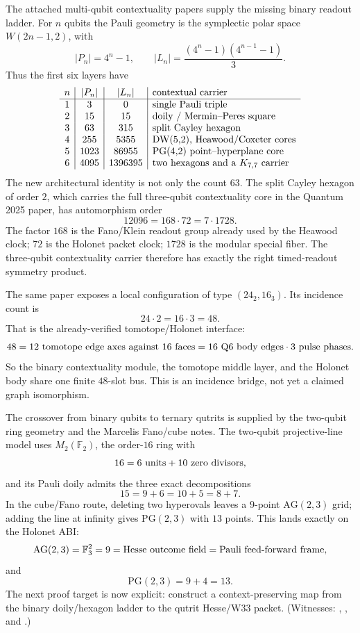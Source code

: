 \documentclass[11pt]{article}
\begin{document}
The attached multi-qubit contextuality papers supply the missing binary
readout ladder.  For \(n\) qubits the Pauli geometry is the symplectic polar
space \(W(2n-1,2)\), with
\[
  |P_n|=4^n-1,\qquad
  |L_n|=\frac{(4^n-1)(4^{n-1}-1)}{3}.
\]
Thus the first six layers have
\[
\begin{array}{c|c|c|l}
n & |P_n| & |L_n| & \hbox{contextual carrier}\\
\hline
1 & 3 & 0 & \hbox{single Pauli triple}\\
2 & 15 & 15 & \hbox{doily / Mermin--Peres square}\\
3 & 63 & 315 & \hbox{split Cayley hexagon}\\
4 & 255 & 5355 & \hbox{DW(5,2), Heawood/Coxeter cores}\\
5 & 1023 & 86955 & \hbox{PG(4,2) point--hyperplane core}\\
6 & 4095 & 1396395 & \hbox{two hexagons and a }K_{7,7}\hbox{ carrier}
\end{array}
\]
The new architectural identity is not only the count \(63\).  The split
Cayley hexagon of order \(2\), which carries the full three-qubit
contextuality core in the Quantum 2025 paper, has automorphism order
\[
  12096 = 168\cdot 72 = 7\cdot 1728.
\]
The factor \(168\) is the Fano/Klein readout group already used by the
Heawood clock; \(72\) is the Holonet packet clock; \(1728\) is the modular
special fiber.  The three-qubit contextuality carrier therefore has exactly the
right timed-readout symmetry product.

The same paper exposes a local configuration of type \((24_2,16_3)\).  Its
incidence count is
\[
  24\cdot2 = 16\cdot3 = 48.
\]
That is the already-verified tomotope/Holonet interface:
\[
  48 = 12\hbox{ tomotope edge axes against }16\hbox{ faces}
     = 16\hbox{ Q6 body edges}\cdot3\hbox{ pulse phases}.
\]
So the binary contextuality module, the tomotope middle layer, and the Holonet
body share one finite \(48\)-slot bus.  This is an incidence bridge, not yet a
claimed graph isomorphism.

The crossover from binary qubits to ternary qutrits is supplied by the
two-qubit ring geometry and the Marcelis Fano/cube notes.  The two-qubit
projective-line model uses \(M_2(\mathbb F_2)\), the order-\(16\) ring with
\[
  16 = 6\hbox{ units} + 10\hbox{ zero divisors},
\]
and its Pauli doily admits the three exact decompositions
\[
  15=9+6=10+5=8+7.
\]
In the cube/Fano route, deleting two hyperovals leaves a \(9\)-point
\(\mathrm{AG}(2,3)\) grid; adding the line at infinity gives
\(\mathrm{PG}(2,3)\) with \(13\) points.  This lands exactly on the Holonet
ABI:
\[
  \mathrm{AG}(2,3)=\mathbb F_3^2=9
    = \hbox{Hesse outcome field}
    = \hbox{Pauli feed-forward frame},
\]
and
\[
  \mathrm{PG}(2,3)=9+4=13.
\]
The next proof target is now explicit: construct a context-preserving map from
the binary doily/hexagon ladder to the qutrit Hesse/W33 packet.  (Witnesses:
,
, and
.)
\end{document}

